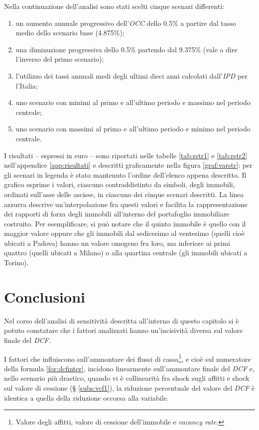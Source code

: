 Nella continuazione dell'analisi sono stati scelti cinque scenari differenti:
\begin{enumerate}
\item un aumento annuale progressivo dell'\textit{OCC} dello 0.5\%  a partire dal tasso medio dello scenario base (4.875\%);
\item una diminuzione progressiva dello 0.5\% partendo dal 9.375\% (vale a dire l'inverso del primo scenario);
\item l'utilizzo dei tassi annuali medi degli ultimi dieci anni calcolati dall'\textit{IPD} per l'Italia;
\item uno scenario con minimi al primo e all'ultimo periodo e massimo nel periodo centrale;
\item uno scenario con massimi al primo e all'ultimo periodo e minimo nel periodo centrale.
\end{enumerate}
I risultati -- espressi in euro -- sono riportati nelle tabelle \ref{tab:rstr1} e \ref{tab:rstr2} nell'appendice \ref{app:risultati} e descritti graficamente nella figura \ref{graf:varstr}: per gli scenari in legenda è stato mantenuto l'ordine dell'elenco appena descritto. Il grafico esprime i valori, ciascuno contraddistinto da simboli, degli immobili, ordinati sull'asse delle ascisse, in ciascuno dei cinque scenari descritti. La linea azzurra descrive  un'interpolazione fra questi valori e facilita la rappresentazione dei rapporti di forza degli immobili all'interno del portafoglio immobiliare costruito. Per esemplificare, si può notare che il quinto immobile è quello con il maggior valore oppure che gli immobili dal sedicesimo al ventesimo (quelli cioè ubicati a Padova) hanno un valore omogeno fra loro, ma inferiore ai primi quattro (quelli ubicati a Milano) o alla quartina centrale (gli immobili ubicati a Torino).


\clearpage

\section{Conclusioni}
Nel corso dell'analisi di sensitività descritta all'interno di questo capitolo si è potuto constatare che i fattori analizzati hanno un'incisività diversa sul valore finale del \textit{DCF}. 

I fattori che influiscono sull'ammontare dei flussi di cassa\footnote{Valore degli affitti, valore di cessione dell'immobile e {\itshape vacancy rate}.}, e cioè sul numeratore della formula  \ref{for:dcfinter}, incidono linearmente sull'ammontare finale del \textit{DCF} e, nello scenario più drastico, quando vi è collinearità fra shock sugli affitti e shock sul valore di cessione (§  \ref{subs:vcf1}), la riduzione percentuale del valore del \textit{DCF} è identica a quella della riduzione occorsa alla variabile.


